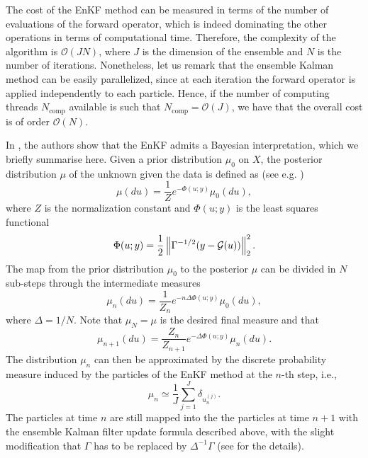 \documentclass[10pt]{article}
\begin{document}
\begin{remark} The cost of the EnKF method can be measured in terms of the number of evaluations of the forward operator, which is indeed dominating the other operations in terms of computational time. Therefore, the complexity of the algorithm is $\mathcal{O}(JN)$, where $J$ is the dimension of the ensemble and $N$ is the number of iterations. Nonetheless, let us remark that the ensemble Kalman method can be easily parallelized, since at each iteration the forward operator is applied independently to each particle. Hence, if the number of computing threads $N_{\mathrm{comp}}$ available is such that $N_{\mathrm{comp}} = \mathcal O(J)$, we have that the overall cost is of order $\mathcal O(N)$. 
\end{remark}

In \cite{ScS17}, the authors show that the EnKF admits a Bayesian interpretation, which we briefly summarise here. Given a prior distribution $\mu_0$ on $X$, the posterior distribution $\mu$ of the unknown given the data is defined as (see e.g. \cite{Stu10})
\begin{equation*}
\mu(du) = \frac{1}{Z} e^{- \Phi(u;y)} \mu_0(du),
\end{equation*}
where $Z$ is the normalization constant and $\Phi(u;y)$ is the least squares functional
\[ \Phi(u;y) = \frac{1}{2} \left\| \Gamma^{-1/2} (y - \mathcal{G}(u)) \right\|_2^2. \]
The map from the prior distribution $\mu_0$ to the posterior $\mu$ can be divided in $N$ sub-steps through the intermediate measures
\begin{equation*}
	\mu_n(du) = \frac{1}{Z_n} e^{- n \Delta \Phi(u;y)} \mu_0(du),
\end{equation*}
where $\Delta = 1/N$. Note that $\mu_N = \mu$ is the desired final measure and that
\begin{equation*}
	\mu_{n+1}(du) = \frac{Z_n}{Z_{n+1}} e^{-\Delta \Phi(u;y)} \mu_n(du).
\end{equation*}
The distribution $\mu_n$ can then be approximated by the discrete probability measure induced by the particles of the EnKF method at the $n$-th step, i.e.,
\begin{equation} \label{mu_delta}
\mu_n \simeq \frac{1}{J} \sum_{j=1}^J \delta_{u_{n}^{(j)}}.
\end{equation}
The particles at time $n$ are still mapped into the the particles at time $n+1$ with the ensemble Kalman filter update formula described above, with the slight modification that $\Gamma$ has to be replaced by $\Delta^{-1} \Gamma$ (see \cite{ScS17} for the details).
\end{document}
